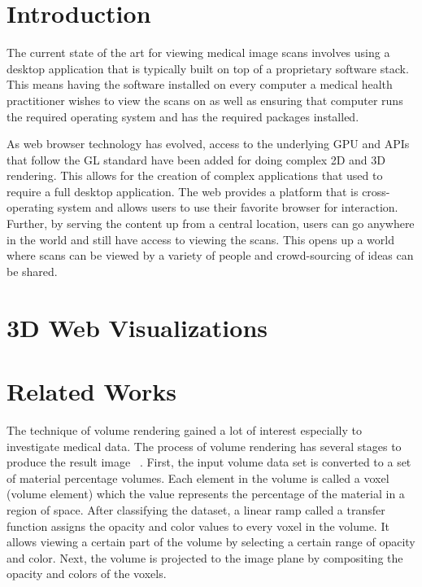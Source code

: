 \documentclass{acm_proc_article-sp}
\begin{document}
\maketitle
\begin{abstract}
\end{abstract}


\section{Introduction}
The current state of the art for viewing medical image scans involves using a desktop application that is typically built on top of a proprietary software stack.  This means having the software installed on every computer a medical health practitioner wishes to view the scans on as well as ensuring that computer runs the required operating system and has the required packages installed.

As web browser technology has evolved, access to the underlying GPU and APIs that follow the GL standard have been added for doing complex 2D and 3D rendering.  This allows for the creation of complex applications that used to require a full desktop application.  The web provides a platform that is cross-operating system and allows users to use their favorite browser for interaction.  Further, by serving the content up from a central location, users can go anywhere in the world and still have access to viewing the scans.  This opens up a world where scans can be viewed by a variety of people and crowd-sourcing of ideas can be shared.

\section{3D Web Visualizations}

\section{Related Works}
The technique of volume rendering gained a lot of interest especially to investigate medical data. The process of volume rendering has several stages to produce the result image ~\cite{drebin:1988}. First, the input volume data set is converted to a set of material percentage volumes. Each element in the volume is called a voxel (volume element) which the value represents the percentage of the material in a region of space. After classifying the dataset, a linear ramp called a transfer function assigns the opacity and color values to every voxel in the volume. It allows viewing a certain part of the volume by selecting a certain range of opacity and color. Next, the volume is projected to the image plane by compositing the opacity and colors of the voxels. 
\end{document}
